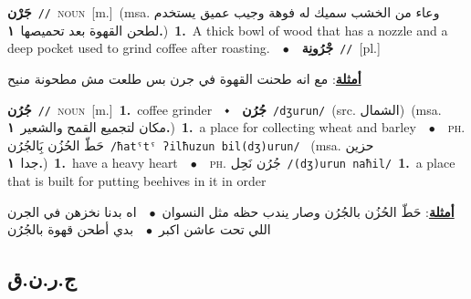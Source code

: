 \documentclass[10pt,a4paper,twoside]{article} %
\begin{document}
\begin{multicols}{2}
{\setlength\topsep{0pt}\textbf{\foreignlanguage{arabic}{جَرْن}}\ {\color{gray}\texttt{//}\color{black}}\ \textsc{noun}\ [m.]\ \color{gray}(msa. \foreignlanguage{arabic}{وعاء من الخشب سميك له فوهة وجيب عميق يستخدم لطحن القهوة بعد تحميصها}~\foreignlanguage{arabic}{\textbf{١.}})\color{black}\ \textbf{1.}~A thick bowl of wood that has a nozzle and a deep pocket used to grind coffee after roasting.\ \ $\bullet$\ \ \setlength\topsep{0pt}\textbf{\foreignlanguage{arabic}{جْرُونِة}}\ {\color{gray}\texttt{//}\color{black}}\ [pl.]\  \begin{flushright}\color{gray}\foreignlanguage{arabic}{\textbf{\underline{\foreignlanguage{arabic}{أمثلة}}}: مع انه طحنت القهوة في جرن بس طلعت مش مطحونة منيح}\end{flushright}\color{black}} \vspace{2mm}

{\setlength\topsep{0pt}\textbf{\foreignlanguage{arabic}{جُرُن}}\ {\color{gray}\texttt{//}\color{black}}\ \textsc{noun}\ [m.]\ \textbf{1.}~coffee grinder\ \ $\smblkdiamond$\ \ \setlength\topsep{0pt}\textbf{\foreignlanguage{arabic}{جُرُن}}\ {\color{gray}\texttt{/dʒurun/}\color{black}}\ (src. \color{gray}\foreignlanguage{arabic}{الشمال}\color{black})\ \color{gray}(msa. \foreignlanguage{arabic}{مكان لتجميع القمح والشعير}~\foreignlanguage{arabic}{\textbf{١.}})\color{black}\ \textbf{1.}~a place for collecting wheat and barley\ \ $\bullet$\ \ \textsc{ph.} \color{gray} \foreignlanguage{arabic}{حَطّ الحُزُن بَِالجُرُن}\color{black}\ {\color{gray}\texttt{/{\sffamily ħatˤtˤ ʔilħuzun bil(dʒ)urun}/}\color{black}}\ \color{gray} (msa. \foreignlanguage{arabic}{حزين جدا}~\foreignlanguage{arabic}{\textbf{١.}})\color{black}\ \textbf{1.}~have a heavy heart\ \ $\bullet$\ \ \textsc{ph.} \color{gray} \foreignlanguage{arabic}{جُرُن نَحِل}\color{black}\ {\color{gray}\texttt{/{\sffamily (dʒ)urun naħil}/}\color{black}}\ \textbf{1.}~a place that is built for putting beehives in it in order\  \begin{flushright}\color{gray}\foreignlanguage{arabic}{\textbf{\underline{\foreignlanguage{arabic}{أمثلة}}}: حَطّ الحُزُن بالجُرُن وصار يندب حظه مثل النسوان\ $\bullet$\ \  اه بدنا نخزهن في الجرن اللي تحت عاشن اكبر\ $\bullet$\ \  بدي أطحن قهوة بالجُرُن}\end{flushright}\color{black}} \vspace{2mm}

\vspace{-3mm}
\subsection*{\color{blue}\foreignlanguage{arabic}{ج.ر.ن.ق}\color{blue}{ (ntws)}} 


\end{multicols}
\end{document}
